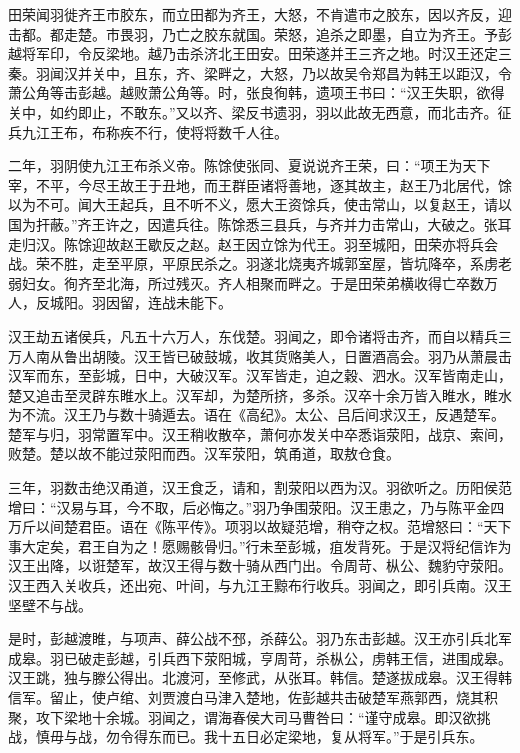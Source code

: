 \documentclass[12pt,UTF8]{ctexbook}
\begin{document}
田荣闻羽徙齐王市胶东，而立田都为齐王，大怒，不肯遣市之胶东，因以齐反，迎击都。都走楚。市畏羽，乃亡之胶东就国。荣怒，追杀之即墨，自立为齐王。予彭越将军印，令反梁地。越乃击杀济北王田安。田荣遂并王三齐之地。时汉王还定三秦。羽闻汉并关中，且东，齐、梁畔之，大怒，乃以故吴令郑昌为韩王以距汉，令萧公角等击彭越。越败萧公角等。时，张良徇韩，遗项王书曰：“汉王失职，欲得关中，如约即止，不敢东。”又以齐、梁反书遗羽，羽以此故无西意，而北击齐。征兵九江王布，布称疾不行，使将将数千人往。



二年，羽阴使九江王布杀义帝。陈馀使张同、夏说说齐王荣，曰：“项王为天下宰，不平，今尽王故王于丑地，而王群臣诸将善地，逐其故主，赵王乃北居代，馀以为不可。闻大王起兵，且不听不义，愿大王资馀兵，使击常山，以复赵王，请以国为扞蔽。”齐王许之，因遣兵往。陈馀悉三县兵，与齐并力击常山，大破之。张耳走归汉。陈馀迎故赵王歇反之赵。赵王因立馀为代王。羽至城阳，田荣亦将兵会战。荣不胜，走至平原，平原民杀之。羽遂北烧夷齐城郭室屋，皆坑降卒，系虏老弱妇女。徇齐至北海，所过残灭。齐人相聚而畔之。于是田荣弟横收得亡卒数万人，反城阳。羽因留，连战未能下。



汉王劫五诸侯兵，凡五十六万人，东伐楚。羽闻之，即令诸将击齐，而自以精兵三万人南从鲁出胡陵。汉王皆已破鼓城，收其货赂美人，日置酒高会。羽乃从萧晨击汉军而东，至彭城，日中，大破汉军。汉军皆走，迫之穀、泗水。汉军皆南走山，楚又追击至灵辟东睢水上。汉军却，为楚所挤，多杀。汉卒十余万皆入睢水，睢水为不流。汉王乃与数十骑遁去。语在《高纪》。太公、吕后间求汉王，反遇楚军。楚军与归，羽常置军中。汉王稍收散卒，萧何亦发关中卒悉诣荥阳，战京、索间，败楚。楚以故不能过荥阳而西。汉军荥阳，筑甬道，取敖仓食。



三年，羽数击绝汉甬道，汉王食乏，请和，割荥阳以西为汉。羽欲听之。历阳侯范增曰：“汉易与耳，今不取，后必悔之。”羽乃争围荥阳。汉王患之，乃与陈平金四万斤以间楚君臣。语在《陈平传》。项羽以故疑范增，稍夺之权。范增怒曰：“天下事大定矣，君王自为之！愿赐骸骨归。”行未至彭城，疽发背死。于是汉将纪信诈为汉王出降，以诳楚军，故汉王得与数十骑从西门出。令周苛、枞公、魏豹守荥阳。汉王西入关收兵，还出宛、叶间，与九江王黥布行收兵。羽闻之，即引兵南。汉王坚壁不与战。



是时，彭越渡睢，与项声、薛公战不邳，杀薛公。羽乃东击彭越。汉王亦引兵北军成皋。羽已破走彭越，引兵西下荥阳城，亨周苛，杀枞公，虏韩王信，进围成皋。汉王跳，独与滕公得出。北渡河，至修武，从张耳。韩信。楚遂拔成皋。汉王得韩信军。留止，使卢绾、刘贾渡白马津入楚地，佐彭越共击破楚军燕郭西，烧其积聚，攻下梁地十余城。羽闻之，谓海春侯大司马曹咎曰：“谨守成皋。即汉欲挑战，慎毋与战，勿令得东而已。我十五日必定梁地，复从将军。”于是引兵东。
\end{document}
